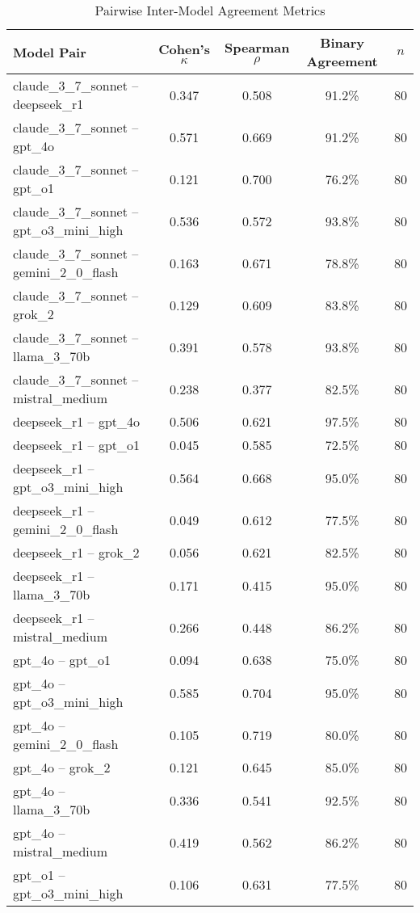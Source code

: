 
\begin{table}[htbp]
\centering
\caption{Pairwise Inter-Model Agreement Metrics}
\label{tab:pairwise_agreement}
\begin{tabular}{lcccc}
\toprule
Model Pair & Cohen's $\kappa$ & Spearman $\rho$ & Binary Agreement & $n$ \\
\midrule
claude\_3\_7\_sonnet -- deepseek\_r1 & 0.347 & 0.508 & 91.2\% & 80 \\
claude\_3\_7\_sonnet -- gpt\_4o & 0.571 & 0.669 & 91.2\% & 80 \\
claude\_3\_7\_sonnet -- gpt\_o1 & 0.121 & 0.700 & 76.2\% & 80 \\
claude\_3\_7\_sonnet -- gpt\_o3\_mini\_high & 0.536 & 0.572 & 93.8\% & 80 \\
claude\_3\_7\_sonnet -- gemini\_2\_0\_flash & 0.163 & 0.671 & 78.8\% & 80 \\
claude\_3\_7\_sonnet -- grok\_2 & 0.129 & 0.609 & 83.8\% & 80 \\
claude\_3\_7\_sonnet -- llama\_3\_70b & 0.391 & 0.578 & 93.8\% & 80 \\
claude\_3\_7\_sonnet -- mistral\_medium & 0.238 & 0.377 & 82.5\% & 80 \\
deepseek\_r1 -- gpt\_4o & 0.506 & 0.621 & 97.5\% & 80 \\
deepseek\_r1 -- gpt\_o1 & 0.045 & 0.585 & 72.5\% & 80 \\
deepseek\_r1 -- gpt\_o3\_mini\_high & 0.564 & 0.668 & 95.0\% & 80 \\
deepseek\_r1 -- gemini\_2\_0\_flash & 0.049 & 0.612 & 77.5\% & 80 \\
deepseek\_r1 -- grok\_2 & 0.056 & 0.621 & 82.5\% & 80 \\
deepseek\_r1 -- llama\_3\_70b & 0.171 & 0.415 & 95.0\% & 80 \\
deepseek\_r1 -- mistral\_medium & 0.266 & 0.448 & 86.2\% & 80 \\
gpt\_4o -- gpt\_o1 & 0.094 & 0.638 & 75.0\% & 80 \\
gpt\_4o -- gpt\_o3\_mini\_high & 0.585 & 0.704 & 95.0\% & 80 \\
gpt\_4o -- gemini\_2\_0\_flash & 0.105 & 0.719 & 80.0\% & 80 \\
gpt\_4o -- grok\_2 & 0.121 & 0.645 & 85.0\% & 80 \\
gpt\_4o -- llama\_3\_70b & 0.336 & 0.541 & 92.5\% & 80 \\
gpt\_4o -- mistral\_medium & 0.419 & 0.562 & 86.2\% & 80 \\
gpt\_o1 -- gpt\_o3\_mini\_high & 0.106 & 0.631 & 77.5\% & 80 \\

\end{tabular}
\end{table}
